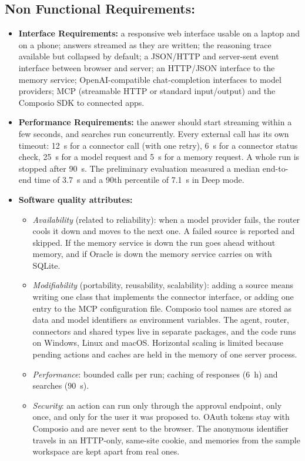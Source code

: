 \documentclass[oneside,a4paper,12pt]{report}
\begin{document}
\subsection{Non Functional Requirements:}
\begin{itemize}
	\item	\textbf{Interface Requirements:} a responsive web interface usable on a laptop and on a phone; answers streamed as they are written; the reasoning trace available but collapsed by default; a JSON/HTTP and server-sent event interface between browser and server; an HTTP/JSON interface to the memory service; OpenAI-compatible chat-completion interfaces to model providers; MCP (streamable HTTP or standard input/output) and the Composio SDK to connected apps.
	\item	\textbf{Performance Requirements:} the answer should start streaming within a few seconds, and searches run concurrently. Every external call has its own timeout: 12~s for a connector call (with one retry), 6~s for a connector status check, 25~s for a model request and 5~s for a memory request. A whole run is stopped after 90~s. The preliminary evaluation measured a median end-to-end time of 3.7~s and a 90th percentile of 7.1~s in Deep mode.
    \item	\textbf{Software quality attributes:}
    \begin{itemize}
    \item \emph{Availability} (related to reliability): when a model provider fails, the router cools it down and moves to the next one. A failed source is reported and skipped. If the memory service is down the run goes ahead without memory, and if Oracle is down the memory service carries on with SQLite.
    \item \emph{Modifiability} (portability, reusability, scalability): adding a source means writing one class that implements the connector interface, or adding one entry to the MCP configuration file. Composio tool names are stored as data and model identifiers as environment variables. The agent, router, connectors and shared types live in separate packages, and the code runs on Windows, Linux and macOS. Horizontal scaling is limited because pending actions and caches are held in the memory of one server process.
    \item \emph{Performance}: bounded calls per run; caching of responses (6~h) and searches (90~s).
    \item \emph{Security}: an action can run only through the approval endpoint, only once, and only for the user it was proposed to. OAuth tokens stay with Composio and are never sent to the browser. The anonymous identifier travels in an HTTP-only, same-site cookie, and memories from the sample workspace are kept apart from real ones.

\end{itemize}
\end{itemize}
\end{document}
